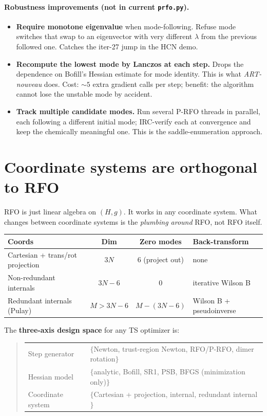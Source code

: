 \documentclass[11pt]{article}
\begin{document}
\paragraph{Robustness improvements (not in current \texttt{prfo.py}).}
\begin{itemize}
  \item \textbf{Require monotone eigenvalue} when mode-following.
        Refuse mode switches that swap to an eigenvector with very
        different $\lambda$ from the previous followed one.  Catches the
        iter-27 jump in the HCN demo.
  \item \textbf{Recompute the lowest mode by Lanczos at each step.}
        Drops the dependence on Bofill's Hessian estimate for mode
        identity.  This is what \emph{ART-nouveau} does.  Cost: $\sim 5$
        extra gradient calls per step; benefit: the algorithm cannot lose
        the unstable mode by accident.
  \item \textbf{Track multiple candidate modes.}  Run several P-RFO
        threads in parallel, each following a different initial mode;
        IRC-verify each at convergence and keep the chemically meaningful
        one.  This is the saddle-enumeration approach.
\end{itemize}

\section{Coordinate systems are orthogonal to RFO}

RFO is just linear algebra on $(H, g)$.  It works in any coordinate system.
What changes between coordinate systems is the \emph{plumbing around} RFO, not
RFO itself.

\begin{center}
\begin{tabular}{l c c l}
\hline
Coords & Dim & Zero modes & Back-transform \\
\hline
Cartesian + trans/rot projection & $3N$ & $6$ (project out) & none \\
Non-redundant internals & $3N-6$ & $0$ & iterative Wilson B \\
Redundant internals (Pulay) & $M > 3N-6$ & $M - (3N-6)$ & Wilson B + pseudoinverse \\
\hline
\end{tabular}
\end{center}

The \textbf{three-axis design space} for any TS optimizer is:
\begin{quote}
\begin{tabular}{l l}
Step generator    & $\{$Newton, trust-region Newton, RFO/P-RFO, dimer rotation$\}$ \\
Hessian model     & $\{$analytic, Bofill, SR1, PSB, BFGS (minimization only)$\}$ \\
Coordinate system & $\{$Cartesian + projection, internal, redundant internal$\}$ \\
\end{tabular}
\end{quote}
\end{document}
